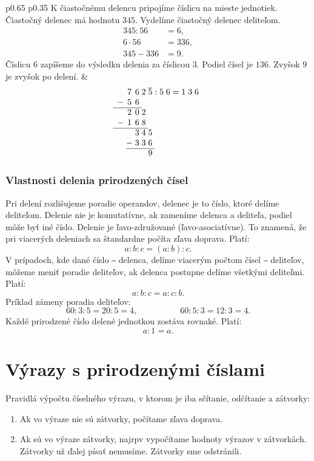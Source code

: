 \documentclass{article}
\begin{document}
\begin{longtable}{p{} p{}}
K čiastočnému delencu pripojíme číslicu na mieste jednotiek. Čiastočný delenec má hodnotu \(345\).
Vydelíme čiastočný delenec deliteľom.
\[
\begin{aligned}
  345 : 56 &= 6, \\
  6 \cdot 56 &= 336, \\
  345 - 336 &= 9.
\end{aligned}
\]
Číslicu \(6\) zapíšeme do výsledku delenia za číslicou \(3\).
Podiel čísel je \(136\). Zvyšok \(9\) je zvyšok po delení.
&
\[
\begin{array}{c@{\;}c@{\;}c@{\;}c@{\;}c@{\;}c@{\;}c@{\;}c@{\;}c@{\;}c@{\;}c@{\;}c}
    & 7 & 6 & 2 & \overline{5} & : & 5 & 6 & = & 1 & 3 & 6 \\
  - & 5 & 6 \\
  \cline{1-3}
    & 2 & 0 & 2 \\
  - & 1 & 6 & 8 \\
  \cline{1-4}
    &   & 3 & 4 & 5 \\
    & - & 3 & 3 & 6\\
  \cline{2-5}
    &   &   &   & 9
\end{array}
\]

\end{longtable}

\subsubsection{Vlastnosti delenia prirodzených čísel}

Pri delení rozlišujeme poradie operandov, delenec je to číslo, ktoré delíme deliteľom. Delenie nie je komutatívne, ak zameníme delenca a deliteľa, podiel môže byť iné číslo. Delenie je ľavo-združované (ľavo-asociatívne). To znamená, že pri viacerých deleniach sa štandardne počíta zľava doprava. Platí:
\[
a : b : c = (a : b) : c.
\]
V prípadoch, kde dané číslo ‒ delenca, delíme viacerým počtom čísel ‒ deliteľov, môžeme meniť poradie deliteľov, ak delenca postupne delíme všetkými deliteľmi. Platí:
\[
a : b : c = a : c : b.
\]
Príklad zámeny poradia deliteľov:
\[
60 : 3 : 5 = 20 : 5 = 4, \hspace{5em} 60 : 5 : 3 = 12 : 3 = 4.
\]
Každé prirodzené číslo delené jednotkou zostáva rovnaké. Platí:
\[
a : 1 = a.
\]

\section{Výrazy s prirodzenými číslami}

Pravidlá výpočtu číselného výrazu, v ktorom je iba sčítanie, odčítanie a zátvorky:
\begin{enumerate}[label=\arabic*)]
  \item Ak vo výraze nie sú zátvorky, počítame zľava doprava.
  \item Ak sú vo výraze zátvorky, najrpv vypočítame hodnoty výrazov v zátvorkách. Zátvorky už ďalej písať nemusíme. Zátvorky sme odstránili.
\end{enumerate}
\end{document}
